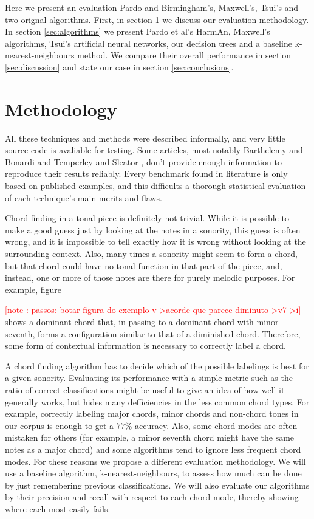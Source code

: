 \documentclass{article}
\newcounter{notecounter}
\newcommand{\note}[1]{
  \addtocounter{notecounter}{1}
  \textcolor{red}{[note \arabic{notecounter}: #1]}
}
\begin{document}
Here we present an evaluation Pardo and Birmingham's, Maxwell's,
Tsui's and two orignal algorithms. First, in section
\ref{sec:methodology} we discuss our evaluation methodology. In
section \ref{sec:algorithms} we present Pardo et al's HarmAn,
Maxwell's algorithms, Tsui's artificial neural networks, our decision
trees and a baseline k-nearest-neighbours method. We compare their
overall performance in section \ref{sec:discussion} and state our case
in section \ref{sec:conclusions}.

\section{Methodology}
\label{sec:methodology}


All these techniques and methods were described informally, and very
little source code is avaliable for testing. Some articles, most
notably Barthelemy and Bonardi \cite{barthelemy.ea:figured} and
Temperley and Sleator \cite{temperley.ea:modeling}, don't provide
enough information to reproduce their results reliably. Every
benchmark found in literature \cite{pardo.ea:automated,
  barthelemy.ea:figured, tsui:harmonic, taube:automatic,
  illescas.ea:harmonic} is only based on published examples, and this
difficults a thorough statistical evaluation of each technique's main
merits and flaws.

Chord finding in a tonal piece is definitely not trivial. While it is
possible to make a good guess just by looking at the notes in a
sonority, this guess is often wrong, and it is impossible to tell
exactly how it is wrong without looking at the surrounding
context. Also, many times a sonority might seem to form a chord, but
that chord could have no tonal function in that part of the piece,
and, instead, one or more of those notes are there for purely melodic
purposes. For example, figure \note{ passos: botar figura do exemplo
  v->acorde que parece diminuto->v7->i} shows a dominant chord that,
in passing to a dominant chord with minor seventh, forms a
configuration similar to that of a diminished chord. Therefore, some
form of contextual information is necessary to correctly label a
chord.

A chord finding algorithm has to decide which of the possible
labelings is best for a given sonority. Evaluating its performance
with a simple metric such as the ratio of correct classifications
might be useful to give an idea of how well it generally works, but
hides many defficiencies in the less common chord types. For example,
correctly labeling major chords, minor chords and non-chord tones in
our corpus is enough to get a $77\%$ accuracy. Also, some chord modes
are often mistaken for others (for example, a minor seventh chord
might have the same notes as a major chord) and some algorithms tend
to ignore less frequent chord modes. For these reasons we propose a
different evaluation methodology. We will use a baseline algorithm,
k-nearest-neighbours, to assess how much can be done by just
remembering previous classifications. We will also evaluate our
algorithms by their precision and recall with respect to each chord
mode, thereby showing where each most easily fails.
\end{document}
